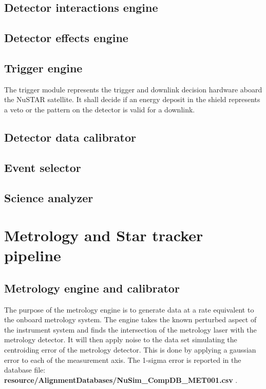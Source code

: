 \subsection{Detector interactions engine}

\subsection{Detector effects engine}

\subsection{Trigger engine}
The trigger module represents the trigger and downlink decision hardware aboard the NuSTAR satellite. It shall decide if an energy deposit in the shield represents a veto or the pattern on the detector is valid for a downlink.

\subsection{Detector data calibrator}

\subsection{Event selector}

\subsection{Science analyzer}

\section{Metrology and Star tracker pipeline}
\subsection{Metrology engine and calibrator}
The purpose of the metrology engine is to generate data at a rate equivalent to the onboard metrology system. The engine takes the known perturbed aspect of the instrument system and finds the intersection of the metrology laser with the metrology detector. It will then apply noise to the data set simulating the centroiding error of the metrology detector. This is done by applying a gaussian error to each of the measurement axis. The 1-sigma error is reported in the database file:\\ \textbf{resource/AlignmentDatabases/NuSim\_CompDB\_MET001.csv} . 

